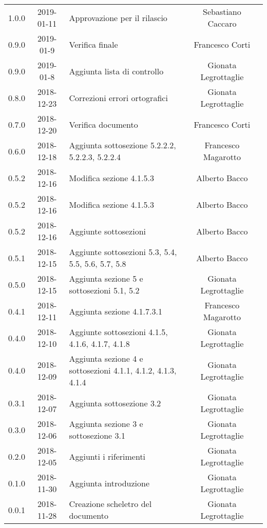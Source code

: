 {\begin{longtable}{ c c C{4cm}  c  c }
		1.0.0 & 2019-01-11 & Approvazione per il rilascio & Sebastiano Caccaro & \Res{} \\
		
		0.9.0 & 2019-01-9 & Verifica finale & Francesco Corti & \ver{} \\
		
		0.9.0 & 2019-01-8 & Aggiunta lista di controllo & Gionata Legrottaglie & \reda{} \\
		
		0.8.0 & 2018-12-23 & Correzioni errori ortografici & Gionata Legrottaglie & \reda{} \\
		
		0.7.0 & 2018-12-20 & Verifica documento & Francesco Corti & \ver{}\\
		
		0.6.0 & 2018-12-18 & Aggiunta sottosezione 5.2.2.2, 5.2.2.3, 5.2.2.4 & Francesco Magarotto & \reda{} \\
		
		0.5.2 & 2018-12-16 & Modifica sezione 4.1.5.3 & Alberto Bacco & \reda{} \\
		
		0.5.2 & 2018-12-16 & Modifica sezione 4.1.5.3 & Alberto Bacco & \reda{} \\
		
		0.5.2 & 2018-12-16 & Aggiunte sottosezioni  & Alberto Bacco & \reda{} \\
		
		0.5.1 & 2018-12-15 & Aggiunte sottosezioni 5.3, 5.4, 5.5, 5.6, 5.7, 5.8 & Alberto Bacco & \reda{} \\
		
		0.5.0 & 2018-12-15 & Aggiunta sezione 5 e sottosezioni 5.1, 5.2 & Gionata Legrottaglie & \reda{} \\
		
		0.4.1 & 2018-12-11 & Aggiunta sezione 4.1.7.3.1 & Francesco Magarotto & \reda{} \\ 
		
		0.4.0 & 2018-12-10 & Aggiunte sottosezioni 4.1.5, 4.1.6, 4.1.7, 4.1.8 & Gionata Legrottaglie & \reda{} \\ 
		0.4.0 & 2018-12-09 & Aggiunta sezione 4 e sottosezioni 4.1.1, 4.1.2, 4.1.3, 4.1.4 & Gionata Legrottaglie & \reda{} \\ 
		
		0.3.1 & 2018-12-07 & Aggiunta sottosezione 3.2 & Gionata Legrottaglie & \reda{} \\ 
		
		0.3.0 & 2018-12-06 & Aggiunta sezione 3 e sottosezione 3.1 & Gionata Legrottaglie & \reda{} \\ 
		
		0.2.0 & 2018-12-05 & Aggiunti i riferimenti & Gionata Legrottaglie & \reda{} \\ 
		
		0.1.0 & 2018-11-30 & Aggiunta introduzione & Gionata Legrottaglie & \reda{} \\
		
		0.0.1 & 2018-11-28 & Creazione scheletro del documento & Gionata Legrottaglie & \reda{}\\
		
	\end{longtable}

}